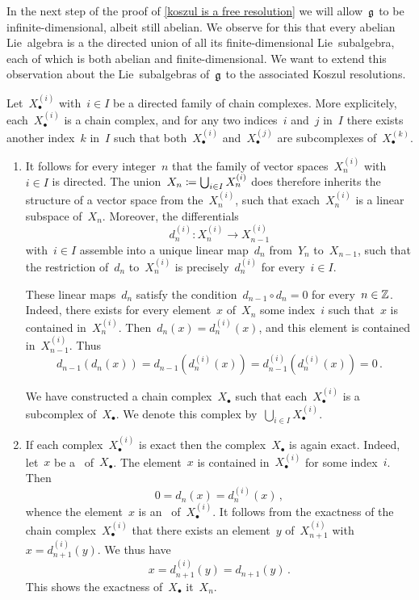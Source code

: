 \begin{fluff}
	In the next step of the proof of \cref{koszul is a free resolution} we will allow~$\mathfrak{g}$ to be infinite-dimensional, albeit still abelian.
	We observe for this that every abelian Lie~algebra is a the directed union of all its finite-dimensional Lie~subalgebra, each of which is both abelian and finite-dimensional.
	We want to extend this observation about the Lie~subalgebras of~$\mathfrak{g}$ to the associated Koszul resolutions.
\end{fluff}


\begin{recall}
	Let~$X^{(i)}_\bullet$ with~$i \in I$ be a directed family of chain complexes.
	More explicitely, each~$X^{(i)}_\bullet$ is a chain complex, and for any two indices~$i$ and~$j$ in~$I$ there exists another index~$k$ in~$I$ such that both~$X^{(i)}_\bullet$ and~$X^{(j)}_\bullet$ are subcomplexes of~$X^{(k)}_\bullet$.
	\begin{enumerate}
		\item
			It follows for every integer~$n$ that the family of vector spaces~$X^{(i)}_n$ with~$i \in I$ is directed.
			The union~$X_n \coloneqq \bigcup_{i \in I} X^{(i)}_n$ does therefore inherits the structure of a vector space from the~$X^{(i)}_n$, such that exach~$X_n^{(i)}$ is a linear subspace of~$X_n$.
			Moreover, the differentials
			\[
				d^{(i)}_n
				\colon
				X^{(i)}_n
				\to
				X^{(i)}_{n-1}
			\]
			with~$i \in I$
			assemble into a unique linear map~$d_n$ from~$Y_n$ to~$X_{n-1}$, such that the restriction of~$d_n$ to~$X^{(i)}_n$ is precisely~$d^{(i)}_n$ for every~$i \in I$.
			
			These linear maps~$d_n$ satisfy the condition~$d_{n-1} \circ d_n = 0$ for every~$n \in \mathbb{Z}$.
			Indeed, there exists for every element~$x$ of~$X_n$ some index~$i$ such that~$x$ is contained in~$X^{(i)}_n$.
			Then~$d_n(x) = d^{(i)}_n(x)$, and this element is contained in~$X^{(i)}_{n-1}$.
			Thus
			\[
				d_{n-1}( d_n( x ) )
				=
				d_{n-1}( d^{(i)}_n( x ) )
				=
				d^{(i)}_{n-1}( d^{(i)}_n( x ) )
				=
				0 \,.
			\]

			We have constructed a chain complex~$X_{\bullet}$ such that each~$X^{(i)}_\bullet$ is a subcomplex of~$X_\bullet$.
			We denote this complex by~$\bigcup_{i \in I} X^{(i)}_\bullet$.
		\item
			If each complex~$X^{(i)}_\bullet$ is exact then the complex~$X_\bullet$ is again exact.
			Indeed, let~$x$ be a~ of~$X_\bullet$.
			The element~$x$ is contained in~$X^{(i)}_\bullet$ for some index~$i$.
			Then
			\[
				0
				=
				d_n(x)
				=
				d^{(i)}_n(x) \,,
			\]
			whence the element~$x$ is an~ of~$X^{(i)}_\bullet$.
			It follows from the exactness of the chain complex~$X^{(i)}_\bullet$ that there exists an element~$y$ of~$X^{(i)}_{n+1}$ with~$x = d^{(i)}_{n+1}(y)$.
			We thus have
			\[
				x
				=
				d^{(i)}_{n+1}( y )
				=
				d_{n+1}(y) \,.
			\]
			This shows the exactness of~$X_\bullet$ it~$X_n$.
	\end{enumerate}
\end{recall}


